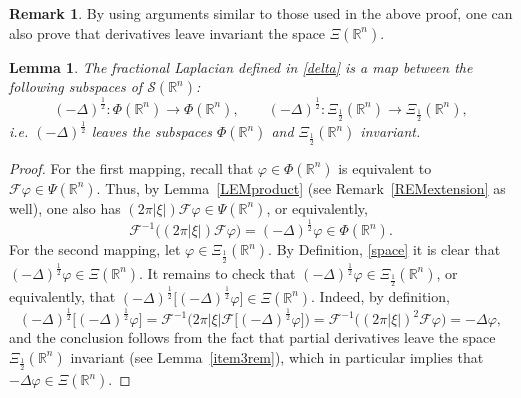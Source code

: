 \documentclass[reqno,11pt]{amsart}
\newtheorem{lemma}[theorem]{Lemma}
\theoremstyle{definition}
\newtheorem{remark}[theorem]{Remark}
\def\R{\mathbb{R}}
\begin{document}
\begin{remark}
\label{reminv}
By using arguments similar to those used in the above proof, one can also prove that derivatives leave invariant the space $\Xi(\mathbb{R}^n)$.
\end{remark}




\begin{lemma}\label{LEMwelldefinedlaplacian}
	The fractional Laplacian defined in \eqref{delta} is a map between the following subspaces of $\mathcal{S}(\R^n)$:
	\[
	(-\Delta)^{\frac{1}{2}} \colon \Phi(\R^n)\to  \Phi(\R^n),\qquad (-\Delta)^{\frac{1}{2}}\colon \Xi_\frac{1}{2}(\R^n)\to \Xi_\frac{1}{2}(\R^n),
	\]
	i.e. $(-\Delta)^\frac{1}{2}$ leaves the subspaces  $\Phi(\R^n)$ and $\Xi_\frac{1}{2}(\R^n)$ invariant.
\end{lemma}
\begin{proof}
	For the first mapping, recall that $\varphi\in \Phi(\R^n)$ is equivalent to $\mathcal{F}\varphi\in\Psi(\R^n)$. Thus, by Lemma~\ref{LEMproduct} (see Remark~\ref{REMextension} as well), one also has $(2 \pi |\xi|) \mathcal{F}\varphi\in\Psi(\R^n)$, or equivalently,
	\[
	\mathcal{F}^{-1}\big( (2 \pi |\xi|) \mathcal{F}\varphi\big)  = (-\Delta)^\frac{1}{2}\varphi \in \Phi(\R^n).
	\]
	For the second mapping, let $\varphi \in \Xi_\frac{1}{2}(\mathbb{R}^n)$. By Definition, \ref{space} it is clear that $(-\Delta)^{\frac{1}{2}} \varphi \in \Xi(\mathbb{R}^n)$. It remains to check that $(-\Delta)^{\frac{1}{2}}\varphi\in \Xi_{\frac{1}{2}}(\R^n)$, or equivalently, that $(-\Delta)^\frac{1}{2}\big[(-\Delta)^{\frac{1}{2}}\varphi\big]\in \Xi(\R^n)$. Indeed, by definition,
	\[
	(-\Delta)^{\frac{1}{2}} \big[(-\Delta)^{\frac{1}{2}}\varphi\big]=\mathcal{F}^{-1}\big(2 \pi |\xi| \mathcal{F}\big[(-\Delta)^{\frac{1}{2}}\varphi\big]\big)=\mathcal{F}^{-1}\big((2 \pi |\xi|)^{2} \mathcal{F}\varphi\big)=-\Delta\varphi,
	\]
	and the conclusion follows from the fact that partial derivatives leave the space $\Xi_\frac{1}{2}(\R^n)$ invariant (see Lemma~\ref{item3rem}), which in particular implies that $-\Delta\varphi \in\Xi(\R^n)$.
\end{proof}
\end{document}
